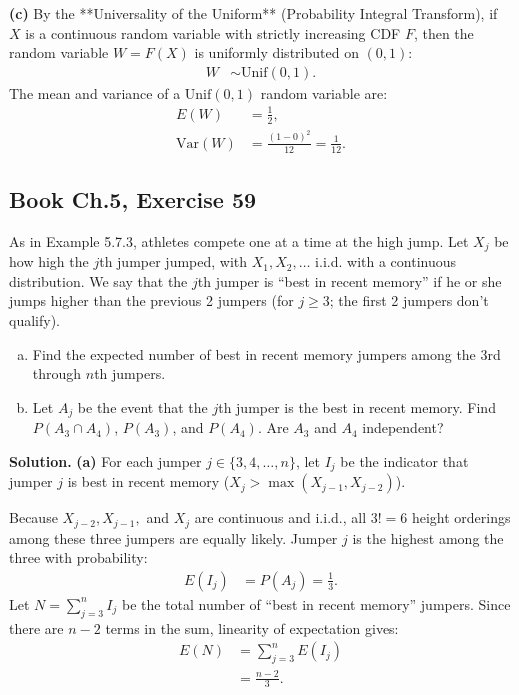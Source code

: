 \documentclass[11pt,a4paper]{article}
\begin{document}
\vspace{4pt}
\noindent \textbf{(c)} By the **Universality of the Uniform** (Probability Integral Transform), if $X$ is a continuous random variable with strictly increasing CDF $F$, then the random variable $W = F(X)$ is uniformly distributed on $(0, 1)$:
\begin{align*}
W &\sim \text{Unif}(0, 1).
\end{align*}
The mean and variance of a $\text{Unif}(0, 1)$ random variable are:
\begin{align*}
E(W) &= \frac{1}{2}, \\
\text{Var}(W) &= \frac{(1 - 0)^2}{12} = \frac{1}{12}.
\end{align*}

\vspace{10pt}
\subsection{Book Ch.5, Exercise 59}
\begin{tcolorbox}[title={Book Ch.5, Exercise 59}]
As in Example 5.7.3, athletes compete one at a time at the high jump. Let $X_j$ be how high the $j$th jumper jumped, with $X_1, X_2, \dots$ i.i.d. with a continuous distribution. We say that the $j$th jumper is ``best in recent memory'' if he or she jumps higher than the previous 2 jumpers (for $j \ge 3$; the first 2 jumpers don't qualify).
\begin{enumerate}[(a)]
\item Find the expected number of best in recent memory jumpers among the 3rd through $n$th jumpers.
\item Let $A_j$ be the event that the $j$th jumper is the best in recent memory. Find $P(A_3 \cap A_4)$, $P(A_3)$, and $P(A_4)$. Are $A_3$ and $A_4$ independent?
\end{enumerate}
\end{tcolorbox}

\noindent \textbf{Solution.} \textbf{(a)} For each jumper $j \in \{3, 4, \dots, n\}$, let $I_j$ be the indicator that jumper $j$ is best in recent memory ($X_j > \max(X_{j-1}, X_{j-2})$). 

Because $X_{j-2}, X_{j-1},$ and $X_j$ are continuous and i.i.d., all $3! = 6$ height orderings among these three jumpers are equally likely. Jumper $j$ is the highest among the three with probability:
\begin{align*}
E(I_j) &= P(A_j) = \frac{1}{3}.
\end{align*}
Let $N = \sum_{j=3}^{n} I_j$ be the total number of ``best in recent memory'' jumpers. Since there are $n - 2$ terms in the sum, linearity of expectation gives:
\begin{align*}
E(N) &= \sum_{j=3}^{n} E(I_j) \\
&= \frac{n - 2}{3}.
\end{align*}
\end{document}
